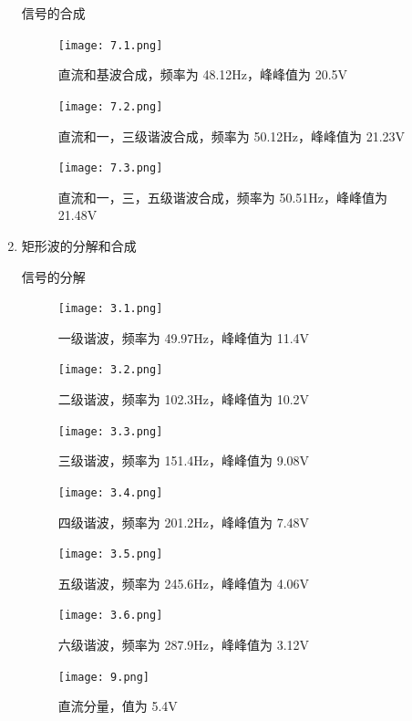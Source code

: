 \documentclass[dvipsnames, svgnames,a4paper,11pt]{article}
\begin{document}
\begin{enumerate}
    \newpage
    信号的合成
    \begin{figure}[htbp]
      \centering
      \begin{minipage}[t]{0.48\textwidth}
      \centering
      \texttt{[image: 7.1.png]}
      \caption{直流和基波合成，频率为 48.12Hz，峰峰值为 20.5V}
      \end{minipage}
      
      \begin{minipage}[t]{0.48\textwidth}
      \centering
      \texttt{[image: 7.2.png]}
      \caption{直流和一，三级谐波合成，频率为 50.12Hz，峰峰值为 21.23V}
      \end{minipage}

      \begin{minipage}[t]{0.48\textwidth}
      \centering
      \texttt{[image: 7.3.png]}
      \caption{直流和一，三，五级谐波合成，频率为 50.51Hz，峰峰值为 21.48V}
      \end{minipage}
    \end{figure}

  \newpage
  \item 矩形波的分解和合成
  
    信号的分解
    \begin{figure}[htbp]
      \centering
      \begin{minipage}[t]{0.48\textwidth}
      \centering
      \texttt{[image: 3.1.png]}
      \caption{一级谐波，频率为 49.97Hz，峰峰值为 11.4V}
      \end{minipage}
      \begin{minipage}[t]{0.48\textwidth}
      \centering
      \texttt{[image: 3.2.png]}
      \caption{二级谐波，频率为 102.3Hz，峰峰值为 10.2V}
      \end{minipage}

      \begin{minipage}[t]{0.48\textwidth}
      \centering
      \texttt{[image: 3.3.png]}
      \caption{三级谐波，频率为 151.4Hz，峰峰值为 9.08V}
      \end{minipage}
      \centering
      \begin{minipage}[t]{0.48\textwidth}
      \centering
      \texttt{[image: 3.4.png]}
      \caption{四级谐波，频率为 201.2Hz，峰峰值为 7.48V}
      \end{minipage}

      \begin{minipage}[t]{0.48\textwidth}
      \centering
      \texttt{[image: 3.5.png]}
      \caption{五级谐波，频率为 245.6Hz，峰峰值为 4.06V}
      \end{minipage}
      \begin{minipage}[t]{0.48\textwidth}
      \centering
      \texttt{[image: 3.6.png]}
      \caption{六级谐波，频率为 287.9Hz，峰峰值为 3.12V}
      \end{minipage}
      \begin{minipage}[t]{0.48\textwidth}
        \centering
        \texttt{[image: 9.png]}
        \caption{直流分量，值为 5.4V}
      \end{minipage}
    \end{figure}


\end{enumerate}
\end{document}

